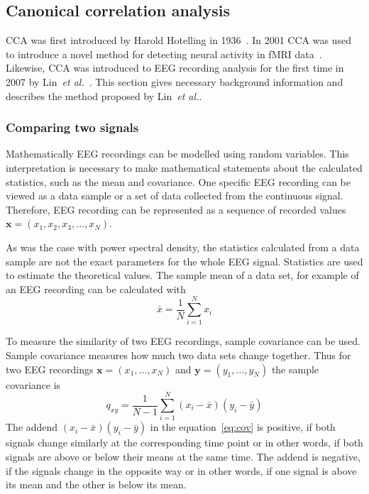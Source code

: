 \subsection{Canonical correlation analysis}

\Gls{CCA} was first introduced by Harold Hotelling in 1936~\cite{cca_hotelling}. In 2001 \gls{CCA} was used to introduce a novel method for detecting neural activity in \gls{fMRI} data~\cite{cca_fmri}. Likewise, \gls{CCA} was introduced to \gls{EEG} recording analysis for the first time in 2007 by Lin~\textit{et al.}~\cite{cca_lin}. This section gives necessary background information and describes the method proposed by Lin~\textit{et al.}.

\subsubsection{Comparing two signals}

Mathematically \gls{EEG} recordings can be modelled using random variables. This interpretation is necessary to make mathematical statements about the calculated statistics, such as the mean and covariance. One specific \gls{EEG} recording can be viewed as a data sample or a set of data collected from the continuous signal. Therefore, \gls{EEG} recording can be represented as a sequence of recorded values $\mathbf{x}=(x_1, x_2, x_3, \dots, x_N)$. 

As was the case with \gls{power spectral density}, the statistics calculated from a data sample are not the exact parameters for the whole \gls{EEG} signal. Statistics are used to estimate the theoretical values. The sample mean of a data set, for example of an \gls{EEG} recording can be calculated with
\begin{equation}
	\bar{x} = \frac{1}{N}\sum_{i=1}^{N}x_i
\end{equation}

To measure the similarity of two \gls{EEG} recordings, sample covariance can be used. Sample covariance measures how much two data sets change together. Thus for two \gls{EEG} recordings $\mathbf{x}=(x_1,\dots,x_N)$ and $\mathbf{y}=(y_1, \dots, y_N)$ the sample covariance is
\begin{equation}
	\label{eq:cov}
	q_{xy} = \frac{1}{N-1}\sum_{i=1}^{N}(x_i-\bar{x})(y_i-\bar{y})
\end{equation}
The addend $(x_i-\bar{x})(y_i-\bar{y})$ in the equation~\ref{eq:cov} is positive, if both signals change similarly at the corresponding time point or in other words, if both signals are above or below their means at the same time. The addend is negative, if the signals change in the opposite way or in other words, if one signal is above its mean and the other is below its mean.

